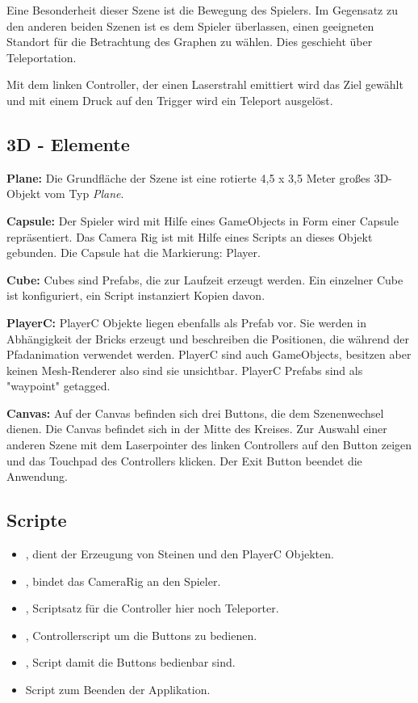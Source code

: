 Eine Besonderheit dieser Szene ist die Bewegung des Spielers. Im Gegensatz zu den anderen beiden Szenen ist es dem Spieler überlassen, einen geeigneten Standort für die Betrachtung des Graphen zu wählen. Dies geschieht über Teleportation. 

Mit dem linken Controller, der einen Laserstrahl emittiert wird das Ziel gewählt und mit einem Druck auf den Trigger wird ein Teleport ausgelöst. 

\subsection{3D - Elemente}

\textbf{Plane: } Die Grundfläche der Szene ist eine rotierte 4,5 x 3,5 Meter großes 3D-Objekt vom Typ \emph{Plane}.

\textbf{Capsule: } Der Spieler wird mit Hilfe eines GameObjects in Form einer Capsule repräsentiert. Das Camera Rig ist mit Hilfe eines Scripts an dieses Objekt gebunden. Die Capsule hat die Markierung: Player.

\textbf{Cube: } Cubes sind Prefabs, die zur Laufzeit erzeugt werden. Ein einzelner Cube ist konfiguriert, ein Script instanziert Kopien davon.

\textbf{PlayerC: } PlayerC Objekte liegen ebenfalls als Prefab vor. Sie werden in Abhängigkeit der Bricks erzeugt und beschreiben die Positionen, die während der Pfadanimation verwendet werden. PlayerC sind auch GameObjects, besitzen aber keinen Mesh-Renderer also sind sie unsichtbar. PlayerC Prefabs sind als "waypoint" getagged.

\textbf{Canvas: } Auf der Canvas befinden sich drei Buttons, die dem Szenenwechsel dienen. Die Canvas befindet sich in der Mitte des Kreises. Zur Auswahl einer anderen Szene mit dem Laserpointer des linken Controllers auf den Button zeigen und das Touchpad des Controllers klicken. Der Exit Button beendet die Anwendung.

\subsection{Scripte}
\label{Graphscripts}
\begin{itemize}
	\item {}, dient der Erzeugung von Steinen und den PlayerC Objekten.
	\item {}, bindet das CameraRig an den Spieler.
	\item {}, Scriptsatz für die Controller hier noch Teleporter.
	\item {}, Controllerscript um die Buttons zu bedienen.
	\item {}, Script damit die Buttons bedienbar sind.
	\item {} Script zum Beenden der Applikation.
\end{itemize}



